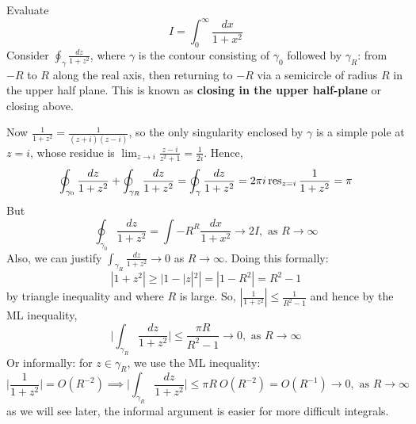 \documentclass[a4paper]{article}
\begin{document}
\begin{eg}
Evaluate
$$I=\int_0^\infty\frac{dx}{1+x^2}$$
Consider $\oint_\gamma\frac{dz}{1+z^2}$, where $\gamma$ is the contour consisting of $\gamma_0$ followed by $\gamma_R$: from $-R$ to $R$ along the real axis, then returning to $-R$ via a semicircle of radius $R$ in the upper half plane. This is known as \textbf{closing in the upper half-plane} or closing above.
\begin{center}
  \end{center}
Now $\frac{1}{1+z^2}=\frac{1}{(z+i)(z-i)}$, so the only singularity enclosed by $\gamma$ is a simple pole at $z=i$, whose residue is $\lim_{z\rightarrow i}\frac{z-i}{z^2+1}=\frac{1}{2i}$. Hence,
$$\oint_{\gamma_0}\frac{dz}{1+z^2}+\oint_{\gamma_R}\frac{dz}{1+z^2}=\oint_{\gamma}\frac{dz}{1+z^2}=2\pi i\operatorname{res}_{z=i}\frac{1}{1+z^2}=\pi$$
But 
$$\oint_{\gamma_0}\frac{dz}{1+z^2}=\int{-R}^R\frac{dx}{1+x^2}\rightarrow 2I,\text{  as  }R\rightarrow\infty$$
Also, we can justify $\int_{\gamma_R}\frac{dz}{1+z^2}\rightarrow 0$ as $R\rightarrow\infty$. Doing this formally:
$$|1+z^2|\geq|1-|z|^2|=|1-R^2|=R^2-1$$
by triangle inequality and where $R$ is large. So, $|\frac{1}{1+z^2}|\leq\frac{1}{R^2-1}$ and hence by the ML inequality,
$$\bigg|\int_{\gamma_R}\frac{dz}{1+z^2}\bigg|\leq\frac{\pi R}{R^2-1}\rightarrow 0,\text{  as  }R\rightarrow\infty$$
Or informally: for $z\in\gamma_R$, we use the ML inequality:
$$\bigg|\frac{1}{1+z^2}\bigg|=O(R^{-2})\implies\bigg|\int_{\gamma_R}\frac{dz}{1+z^2}\bigg|\leq\pi R~O(R^{-2})=O(R^{-1})\rightarrow 0,\text{ as }R\rightarrow\infty$$
as we will see later, the informal argument is easier for more difficult integrals.
\end{eg}
\end{document}
